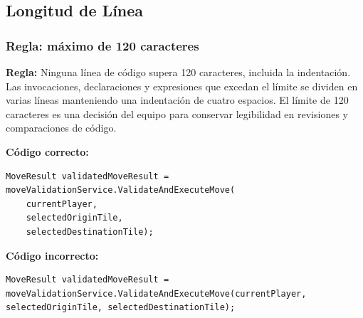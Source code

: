\subsection{Longitud de Línea}

\subsubsection{Regla: máximo de 120 caracteres}

\textbf{Regla:} Ninguna línea de código supera 120 caracteres, incluida la indentación. Las invocaciones, declaraciones y expresiones que excedan el límite se dividen en varias líneas manteniendo una indentación de cuatro espacios. El límite de 120 caracteres es una decisión del equipo para conservar legibilidad en revisiones y comparaciones de código.

\textbf{Código correcto:}
\begin{lstlisting}[style=csharpstyle]
MoveResult validatedMoveResult = moveValidationService.ValidateAndExecuteMove(
    currentPlayer,
    selectedOriginTile,
    selectedDestinationTile);
\end{lstlisting}

\textbf{Código incorrecto:}
\begin{lstlisting}[style=csharpstyle]
MoveResult validatedMoveResult = moveValidationService.ValidateAndExecuteMove(currentPlayer, selectedOriginTile, selectedDestinationTile);
\end{lstlisting}
